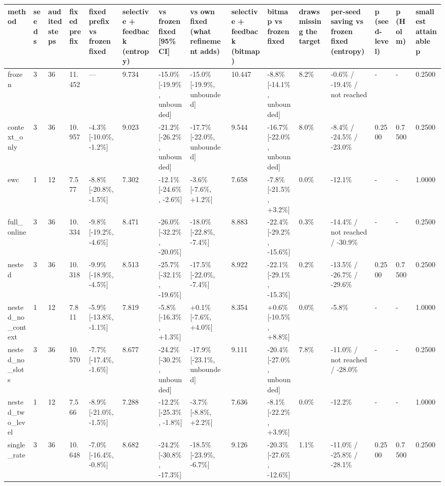 \begin{tabular}{lllllllllllllll}
\hline
method & seeds & audited steps & fixed prefix & fixed prefix vs frozen fixed & selective + feedback (entropy) & vs frozen fixed [95\% CI] & vs own fixed (what refinement adds) & selective + feedback (bitmap) & bitmap vs frozen fixed & draws missing the target & per-seed saving vs frozen fixed (entropy) & p (seed-level) & p (Holm) & smallest attainable p \\
\hline
frozen & 3 & 36 & 11.452 & — & 9.734 & -15.0\% [-19.9\%, unbounded] & -15.0\% [-19.9\%, unbounded] & 10.447 & -8.8\% [-14.1\%, unbounded] & 8.2\% & -0.6\% / -19.4\% / not reached & - & - & 0.2500 \\
context\_only & 3 & 36 & 10.957 & -4.3\% [-10.0\%, -1.2\%] & 9.023 & -21.2\% [-26.2\%, unbounded] & -17.7\% [-22.0\%, unbounded] & 9.544 & -16.7\% [-22.0\%, unbounded] & 8.0\% & -8.4\% / -24.5\% / -23.0\% & 0.2500 & 0.7500 & 0.2500 \\
ewc & 1 & 12 & 7.577 & -8.8\% [-20.8\%, -1.5\%] & 7.302 & -12.1\% [-24.6\%, -2.6\%] & -3.6\% [-7.6\%, +1.2\%] & 7.658 & -7.8\% [-21.5\%, +3.2\%] & 0.0\% & -12.1\% & - & - & 1.0000 \\
full\_online & 3 & 36 & 10.334 & -9.8\% [-19.2\%, -4.6\%] & 8.471 & -26.0\% [-32.2\%, -20.0\%] & -18.0\% [-22.8\%, -7.4\%] & 8.883 & -22.4\% [-29.2\%, -15.6\%] & 0.3\% & -14.4\% / not reached / -30.9\% & - & - & 0.2500 \\
nested & 3 & 36 & 10.318 & -9.9\% [-18.9\%, -4.5\%] & 8.513 & -25.7\% [-32.1\%, -19.6\%] & -17.5\% [-22.0\%, -7.4\%] & 8.922 & -22.1\% [-29.1\%, -15.3\%] & 0.2\% & -13.5\% / -26.7\% / -29.6\% & 0.2500 & 0.7500 & 0.2500 \\
nested\_no\_context & 1 & 12 & 7.811 & -5.9\% [-13.8\%, -1.1\%] & 7.819 & -5.8\% [-16.3\%, +1.3\%] & +0.1\% [-7.6\%, +4.0\%] & 8.354 & +0.6\% [-10.5\%, +8.8\%] & 0.0\% & -5.8\% & - & - & 1.0000 \\
nested\_no\_slots & 3 & 36 & 10.570 & -7.7\% [-17.4\%, -1.6\%] & 8.677 & -24.2\% [-30.2\%, unbounded] & -17.9\% [-23.1\%, unbounded] & 9.111 & -20.4\% [-27.0\%, unbounded] & 7.8\% & -11.0\% / not reached / -28.0\% & - & - & 0.2500 \\
nested\_two\_level & 1 & 12 & 7.566 & -8.9\% [-21.0\%, -1.5\%] & 7.288 & -12.2\% [-25.3\%, -1.8\%] & -3.7\% [-8.8\%, +2.2\%] & 7.636 & -8.1\% [-22.2\%, +3.9\%] & 0.0\% & -12.2\% & - & - & 1.0000 \\
single\_rate & 3 & 36 & 10.648 & -7.0\% [-16.4\%, -0.8\%] & 8.682 & -24.2\% [-30.8\%, -17.3\%] & -18.5\% [-23.9\%, -6.7\%] & 9.126 & -20.3\% [-27.6\%, -12.6\%] & 1.1\% & -11.0\% / -25.8\% / -28.1\% & 0.2500 & 0.7500 & 0.2500 \\
\hline
\end{tabular}
